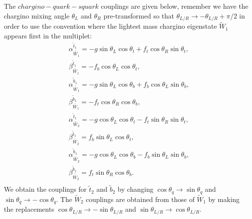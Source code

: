 \documentclass[final,3p,times]{elsarticle}
\begin{document}
The $chargino - quark - squark$ couplings are given below, remember we have the chargino mixing angle $\theta_L$ and $\theta_R$ pre-transformed so that $\theta_{L/R} \rightarrow -\theta_{L/R} + \pi/2$ in order to use the convention where the lightest mass chargino eigenstate $\tilde{W}_1$ appears first in the multiplet:
\begin{equation}
\begin{aligned}
& \alpha_{\tilde{W_1}}^{\tilde{t}_1} = -g \sin\theta_L\cos\theta_t + f_t \cos\theta_R\sin\theta_t, \\ & \beta_{\tilde{W_1}}^{\tilde{t}_1} = - f_b \cos\theta_L\cos\theta_t, \\ & \alpha_{\tilde{W_1}}^{\tilde{b}_1} = -g \sin\theta_L\cos\theta_b + f_b \cos\theta_L\sin\theta_b, \\ & \beta_{\tilde{W_1}}^{\tilde{b}_1} = - f_t \cos\theta_R\cos\theta_b, \\ & \alpha_{\tilde{W_2}}^{\tilde{t}_1} = -g \cos\theta_L\cos\theta_t - f_t \sin\theta_R\sin\theta_t, \\ & \beta_{\tilde{W_2}}^{\tilde{t}_1} =  f_b \sin\theta_L\cos\theta_t, \\ & \alpha_{\tilde{W_2}}^{\tilde{b}_1} = -g \cos\theta_L\cos\theta_b - f_b \sin\theta_L\sin\theta_b, \\ & \beta_{\tilde{W_2}}^{\tilde{b}_1} =  f_t \sin\theta_R\cos\theta_b. \\
\end{aligned}
\end{equation}
We obtain the couplings for $\tilde{t}_2$ and $\tilde{b}_2$ by changing $\cos\theta_{q} \rightarrow \sin\theta_q$ and $\sin\theta_q \rightarrow -\cos\theta_q$. The $\tilde{W}_2$ couplings are obtained from those of $\tilde{W}_1$ by making the replacements $\cos\theta_{L/R} \rightarrow -\sin\theta_{L/R}$ and $\sin\theta_{L/R} \rightarrow \cos\theta_{L/R}$.
\end{document}
